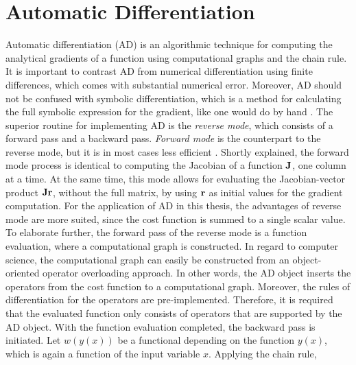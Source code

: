 


\section{Automatic Differentiation}\label{sec:theory_AD}
\noindent
Automatic differentiation (AD) is an algorithmic technique for computing the analytical gradients of a function using computational graphs and the chain rule.
It is important to contrast AD from numerical differentiation using finite differences, which comes with substantial numerical error.
Moreover, AD should not be confused with symbolic differentiation, which is a method for calculating the full symbolic expression for the gradient, like one would do by hand \cite{baydin2018automatic}.
The superior routine for implementing AD is the \emph{reverse mode}, which consists of a forward pass and a backward pass.
\emph{Forward mode} is the counterpart to the reverse mode, but it is in most cases less efficient \cite{baydin2018automatic}.
Shortly explained, the forward mode process is identical to computing the Jacobian of a function $\bm{\mathrm{J}}$, one column at a time.
At the same time, this mode allows for evaluating the Jacobian-vector product $\bm{\mathrm{Jr}}$, without the full matrix, by using $\bm{\mathrm{r}}$ as initial values for the gradient computation.
For the application of AD in this thesis, the advantages of reverse mode are more suited, since the cost function is summed to a single scalar value.
To elaborate further, the forward pass of the reverse mode is a function evaluation, where a computational graph is constructed.
In regard to computer science, the computational graph can easily be constructed from an object-oriented operator overloading approach.
In other words, the AD object inserts the operators from the cost function to a computational graph.
Moreover, the rules of differentiation for the operators are pre-implemented.
Therefore, it is required that the evaluated function only consists of operators that are supported by the AD object.
With the function evaluation completed, the backward pass is initiated.
Let $w(y(x))$ be a functional depending on the function $y(x)$, which is again a function of the input variable $x$. Applying the chain rule,

